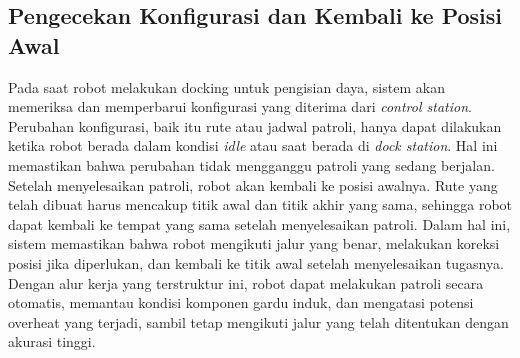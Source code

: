 \subsection{Pengecekan Konfigurasi dan Kembali ke Posisi Awal}
Pada saat robot melakukan docking untuk pengisian daya, sistem akan memeriksa dan memperbarui konfigurasi yang diterima dari \emph{control station}. Perubahan konfigurasi, baik itu rute atau jadwal patroli, hanya dapat dilakukan ketika robot berada dalam kondisi \emph{idle} atau saat berada di \emph{dock station}. Hal ini memastikan bahwa perubahan tidak mengganggu patroli yang sedang berjalan. Setelah menyelesaikan patroli, robot akan kembali ke posisi awalnya. Rute yang telah dibuat harus mencakup titik awal dan titik akhir yang sama, sehingga robot dapat kembali ke tempat yang sama setelah menyelesaikan patroli. Dalam hal ini, sistem memastikan bahwa robot mengikuti jalur yang benar, melakukan koreksi posisi jika diperlukan, dan kembali ke titik awal setelah menyelesaikan tugasnya. Dengan alur kerja yang terstruktur ini, robot dapat melakukan patroli secara otomatis, memantau kondisi komponen gardu induk, dan mengatasi potensi overheat yang terjadi, sambil tetap mengikuti jalur yang telah ditentukan dengan akurasi tinggi.
